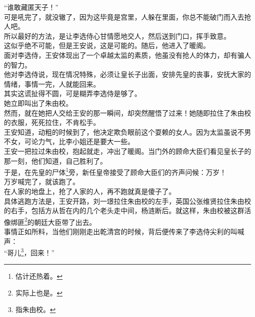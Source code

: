 \begin{multicols}{\theparacolNo}
“谁敢藏匿天子！”\\

可是吼完了，就没辙了，因为这毕竟是宫里，人躲在里面，你总不能破门而入去抢人吧。\\

所以最好的方法，是让李选侍心甘情愿地交人，然后送到门口，挥手致意。\\

这似乎绝不可能，但是王安说，这是可能的。随后，他进入了暖阁。\\

面对李选侍，王安体现出了一个卓越太监的素质，他虽没有抢人的体力，却有骗人的智力。\\

他对李选侍说，现在情况特殊，必须让皇长子出面，安排先皇的丧事，安抚大家的情绪，事情一完，人就能回来。\\

其实这谎扯得不圆，可是糊弄李选侍是够了。\\

她立即叫出了朱由校。\\

然而，就在她把人交给王安的那一瞬间，却突然醒悟了过来！她随即拉住了朱由校的衣服，死死拉住，不肯松手。\\

王安知道，动粗的时候到了，他决定欺负眼前这个耍赖的女人。因为太监虽说不男不女，可论力气，比李小姐还是要大一些。\\

王安一把拉过朱由校，抱起就走，冲出了暖阁。当门外的顾命大臣们看见皇长子的那一刻，他们知道，自己胜利了。\\

于是，在先皇的尸体\footnote{估计还热着。}旁，新任皇帝接受了顾命大臣们的齐声问候：万岁！\\

万岁喊完了，就该跑了。\\

在人家的地盘上，抢了人家的人，再不跑就真是傻子了。\\

具体逃跑方法是，王安开路，刘一璟拉住朱由校的左手，英国公张维贤拉住朱由校的右手，包括方从哲在内的几个老头走中间，杨涟断后。就这样，朱由校被这群活像绑匪\footnote{实际上也是。}的朝廷大臣带了出去。\\

事情正如所料，当他们刚刚走出乾清宫的时候，背后便传来了李选侍尖利的叫喊声：\\

“哥儿\footnote{指朱由校。}，回来！”\\


\end{multicols}
